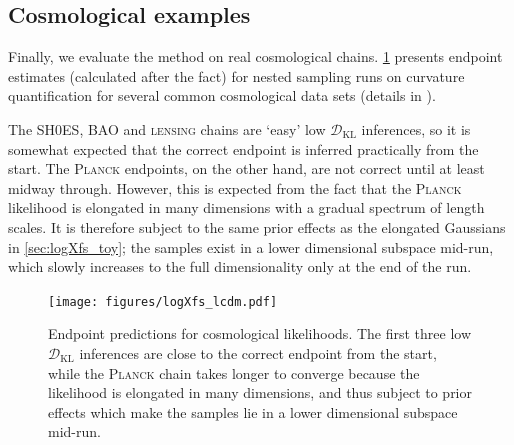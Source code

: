 \documentclass[usenatbib]{mnras}
\newcommand{\DKL}{\mathcal{D}_\mathrm{KL}}
\begin{document}
\subsection{Cosmological examples}\label{sec:cosmological_examples}
Finally, we evaluate the method on real cosmological chains. \cref{fig:logXfs_lcdm} presents endpoint estimates (calculated after the fact) for nested sampling runs on curvature quantification for several common cosmological data sets (details in \citealt{curvature_tension}). 
\par
The \textsc{SH0ES}, \textsc{BAO} and \textsc{lensing} chains are `easy' low $\DKL$ inferences, so it is somewhat expected that the correct endpoint is inferred practically from the start. The \textsc{Planck} endpoints, on the other hand, are not correct until at least midway through. However, this is expected from the fact that the \textsc{Planck} likelihood is elongated in many dimensions with a gradual spectrum of length scales. It is therefore subject to the same prior effects as the elongated Gaussians in \cref{sec:logXfs_toy}; the samples exist in a lower dimensional subspace mid-run, which slowly increases to the full dimensionality only at the end of the run.
\begin{figure}
\begin{center}
    \texttt{[image: figures/logXfs\_lcdm.pdf]}
\end{center}
\caption{Endpoint predictions for cosmological likelihoods. The first three low $\DKL$ inferences are close to the correct endpoint from the start, while the \textsc{Planck} chain takes longer to converge because the likelihood is elongated in many dimensions, and thus subject to prior effects which make the samples lie in a lower dimensional subspace mid-run.}
\label{fig:logXfs_lcdm}
\end{figure}
\end{document}
